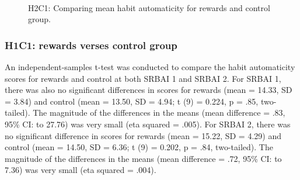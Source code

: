 \documentclass{scaffold/sigchi}
\begin{document}
\begin{figure}
  \centering
  \caption{H2C1: Comparing mean habit automaticity for rewards and control group.}~\label{fig:habit_4_item_survey1_v_survey2}
\end{figure}

\subsubsection{H1C1: rewards verses control group}

An independent-samples t-test was conducted to compare the habit automaticity scores
for rewards and control at both SRBAI 1 and SRBAI 2. For SRBAI 1, there was also no significant differences in scores for rewards (mean = 14.33, SD = 3.84) and control (mean = 13.50, SD = 4.94; t (9) = 0.224, p = .85,
two-tailed). The magnitude of the differences in the means (mean difference = .83,
95\% CI:  to 27.76) was very small (eta squared = .005). For SRBAI 2, there was no significant difference in scores for rewards
(mean = 15.22, SD = 4.29) and control (mean = 14.50, SD = 6.36; t (9) = 0.202, p = .84,
two-tailed). The magnitude of the differences in the means (mean difference = .72,
95\% CI:  to 7.36) was very small (eta squared = .004).
\end{document}
